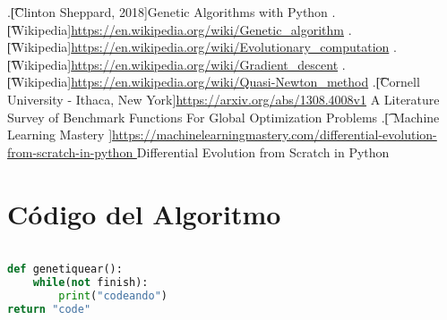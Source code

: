 \documentclass[10pt]{article}
\begin{document}
\begin{thebibliography}{99} %
.\t[Clinton Sheppard, 2018]{}Genetic Algorithms with Python
.\t[Wikipedia]{}\url{https://en.wikipedia.org/wiki/Genetic_algorithm}
.\t[Wikipedia]{}\url{https://en.wikipedia.org/wiki/Evolutionary_computation}
.\t[Wikipedia]{}\url{https://en.wikipedia.org/wiki/Gradient_descent}
.\t[Wikipedia]{}\url{https://en.wikipedia.org/wiki/Quasi-Newton_method}
.\t[Cornell University - Ithaca, New York]{}\url{https://arxiv.org/abs/1308.4008v1} A Literature Survey of Benchmark Functions For Global Optimization Problems
.\t[ Machine Learning Mastery ]{}\url{https://machinelearningmastery.com/differential-evolution-from-scratch-in-python } Differential Evolution from Scratch in Python


\end{thebibliography} 
 
\section{Código del Algoritmo}
\begin{lstlisting}[language=Python]

def genetiquear():
	while(not finish):
		print("codeando")
return "code"

\end{lstlisting}
\newpage
\tableofcontents
\end{document}

